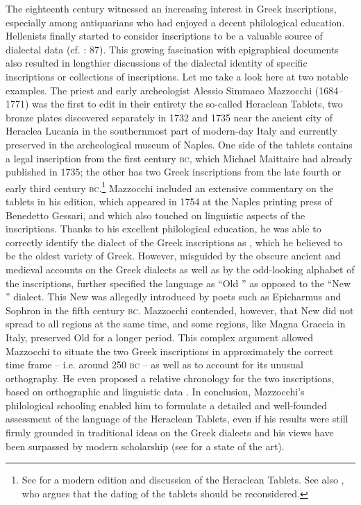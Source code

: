 The eighteenth century witnessed an increasing interest in Greek inscriptions, especially among antiquarians who had enjoyed a decent philological education. Hellenists finally started to consider inscriptions to be a valuable source of dialectal data (cf. \citealt{Walch1772}: 87). This growing fascination with epigraphical documents also resulted in lengthier discussions of the dialectal identity of specific inscriptions or collections of inscriptions. Let me take a look here at two notable  examples. The priest and early archeologist Alessio Simmaco Mazzocchi (1684–1771) was the first to edit in their entirety the so-called Heraclean Tablets, two bronze plates discovered separately in 1732 and 1735 near the ancient city of Heraclea Lucania in the southernmost part of modern-day Italy and currently preserved in the archeological museum of Naples. One side of the tablets contains a  legal inscription from the first century \textsc{bc}, which Michael Maittaire had already published in 1735; the other has two Greek inscriptions from the late fourth or early third century \textsc{bc}.\footnote{See \citet{Uguzzoni1968} for a modern edition and discussion of the Heraclean Tablets. See also \citet{Weiss2016}, who argues that the dating of the tablets should be reconsidered.} Mazzocchi included an extensive commentary on the tablets in his edition, which appeared in 1754 at the Naples printing press of Benedetto Gessari, and which also touched on linguistic aspects of the inscriptions. Thanks to his excellent philological education, he was able to correctly identify the dialect of the Greek inscriptions as , which he believed to be the oldest variety of Greek. However, misguided by the obscure ancient and medieval accounts on the Greek dialects as well as by the odd-looking alphabet of the inscriptions, \citet[118--120]{Mazzocchi1754} further specified the language as “Old ” as opposed to the “New ” dialect. This New  was allegedly introduced by  poets such as Epicharmus and Sophron in the fifth century \textsc{bc}. Mazzocchi contended, however, that New  did not spread to all regions at the same time, and some regions, like Magna Graecia in Italy, preserved Old  for a longer period. This complex argument allowed Mazzocchi to situate the two Greek inscriptions in approximately the correct time frame – i.e. around 250 \textsc{bc} – as well as to account for its unusual orthography. He even proposed a relative chronology for the two inscriptions, based on orthographic and linguistic data \citep[135]{Mazzocchi1754}. In conclusion, Mazzocchi’s philological schooling enabled him to formulate a detailed and well-founded assessment of the language of the Heraclean Tablets, even if his results were still firmly grounded in traditional ideas on the Greek dialects and his views have been surpassed by modern scholarship (see \citealt{Weiss2016} for a state of the art).

